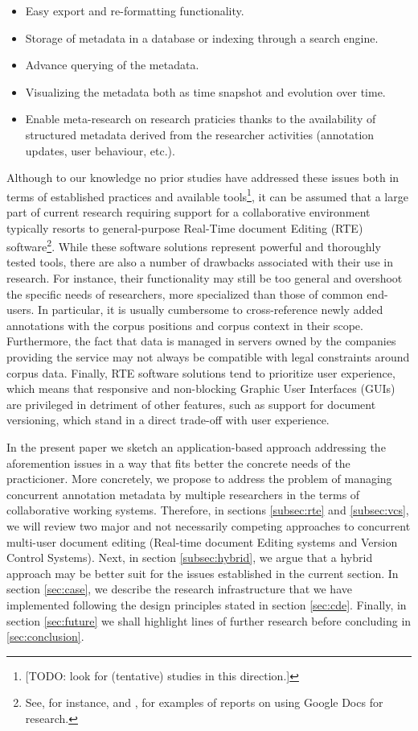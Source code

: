 \documentclass{sig-alternate}
\begin{document}
\begin{itemize}
\item Easy export and re-formatting functionality.
\item Storage of metadata in a database or indexing through a search engine.
\item Advance querying of the metadata.
\item Visualizing the metadata both as time snapshot and evolution over time.
\item Enable meta-research on research praticies thanks to the availability of structured
  metadata derived from the researcher activities (annotation updates, user behaviour, etc.).
\end{itemize}

Although to our knowledge no prior studies have addressed these issues both in terms of
established practices and available tools\footnote{
  [TODO: look for (tentative) studies in this direction.]
}, it can be assumed that a large part of current research requiring support for a
collaborative environment typically resorts to general-purpose Real-Time document Editing
(RTE) software\footnote{
  See, for instance, \cite{Rowlands2011} and \cite{Wood2011}, for examples of reports on
  using Google Docs for research.
}.
While these software solutions represent powerful and thoroughly tested tools, there are also
a number of drawbacks associated with their use in research.
For instance, their functionality may still be too general and overshoot the specific needs of
researchers, more specialized than those of common end-users. In particular, it is usually
cumbersome to cross-reference newly added annotations with the corpus positions and corpus
context in their scope.
Furthermore, the fact that data is managed in servers owned by the companies providing the
service may not always be compatible with legal constraints around corpus data.
Finally, RTE software solutions tend to prioritize user experience, which means that
responsive and non-blocking Graphic User Interfaces (GUIs) are privileged in detriment of
other features, such as support for document versioning, which stand in a direct trade-off
with user experience.

In the present paper we sketch an application-based approach addressing the aforemention
issues in a way that fits better the concrete needs of the practicioner.
More concretely, we propose to address the problem of managing concurrent annotation
metadata by multiple researchers in the terms of collaborative working systems.
Therefore, in sections \ref{subsec:rte} and \ref{subsec:vcs}, we will review two major and
not necessarily competing approaches to concurrent multi-user document editing
(Real-time document Editing systems and Version Control Systems).
Next, in section \ref{subsec:hybrid}, we argue that a hybrid approach may be better suit for
the issues established in the current section.
In section \ref{sec:case}, we describe the research infrastructure that we have implemented
following the design principles stated in section \ref{sec:cde}.
Finally, in section \ref{sec:future} we shall highlight lines of further research before
concluding in \ref{sec:conclusion}.
\end{document}
